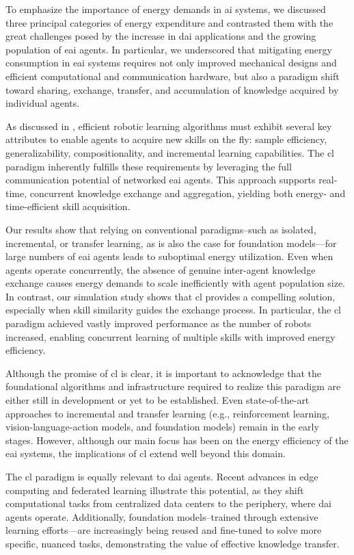 \documentclass[12pt]{article}
\begin{document}
To emphasize the importance of energy demands in \ac{ai} systems, we discussed three principal categories of energy expenditure and contrasted them with the great challenges posed by the increase in \acl{dai} applications and the growing population of \ac{eai} agents. In particular, we underscored that mitigating energy consumption in \ac{eai} systems requires not only improved mechanical designs and efficient computational and communication hardware, but also a paradigm shift toward sharing, exchange, transfer, and accumulation of knowledge acquired by individual agents.

As discussed in \cite{Kaelbling2020foundationefficientrobot}, efficient robotic learning algorithms must exhibit several key attributes to enable agents to acquire new skills on the fly: sample efficiency, generalizability, compositionality, and incremental learning capabilities. The \acl{cl} paradigm inherently fulfills these requirements by leveraging the full communication potential of networked \ac{eai} agents. This approach supports real-time, concurrent knowledge exchange and aggregation, yielding both energy- and time-efficient skill acquisition.

Our results show that relying on conventional paradigms--such as isolated, incremental, or transfer learning, as is also the case for foundation models---for large numbers of \ac{eai} agents leads to suboptimal energy utilization. Even when agents operate concurrently, the absence of genuine inter-agent knowledge exchange causes energy demands to scale inefficiently with agent population size. In contrast, our simulation study shows that \ac{cl} provides a compelling solution, especially when skill similarity guides the exchange process. In particular, the \ac{cl} paradigm achieved vastly improved performance as the number of robots increased, enabling concurrent learning of multiple skills with improved energy efficiency.

Although the promise of \ac{cl} is clear, it is important to acknowledge that the foundational algorithms and infrastructure required to realize this paradigm are either still in development or yet to be established. Even state-of-the-art approaches to incremental and transfer learning (e.g., reinforcement learning, vision-language-action models, and foundation models) remain in the early stages. However, although our main focus has been on the energy efficiency of the \ac{eai} systems, the implications of \ac{cl} extend well beyond this domain.

The \ac{cl} paradigm is equally relevant to \ac{dai} agents. Recent advances in edge computing and federated learning illustrate this potential, as they shift computational tasks from centralized data centers to the periphery, where \ac{dai} agents operate. Additionally, foundation models--trained through extensive learning efforts---are increasingly being reused and fine-tuned to solve more specific, nuanced tasks, demonstrating the value of effective knowledge transfer.
\end{document}
